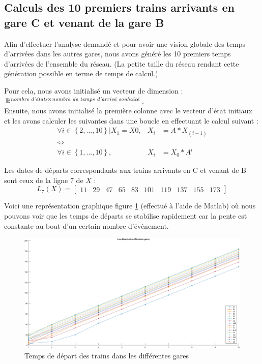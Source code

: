 \subsection{Calculs des 10 premiers trains arrivants en gare C et venant de la gare B}
Afin d'effectuer l'analyse demandé et pour avoir une vision globale des temps d'arrivées dans les autres gares, nous avons généré les 10 premiers temps d'arrivées de l'ensemble du réseau. (La petite taille du réseau rendant cette génération possible en terme de temps de calcul.)

Pour cela, nous avons initialisé un vecteur de dimension : $\mathbb{R}^{ \text{\emph{nombre d'états}} \times \text{\emph{nombre de temps d'arrivé souhaité}}}$.\\
Ensuite, nous avons initialisé la première colonne avec le vecteur d'état initiaux et les avons calculer les suivantes dans une boucle en effectuant le calcul suivant : 
\begin{eqnarray}
\forall i \in \left\lbrace 2, ..., 10\right\rbrace | X_1 = X0 ,&    X_{i}&=A*X_{(i-1)}\\
\Leftrightarrow&&\\
\forall i \in \left\lbrace 1, ..., 10\right\rbrace ,&    X_{i}&=X_0*A^i
\end{eqnarray}

Les dates de départs correspondants aux trains arrivants en C et venant de B sont ceux  de la ligne 7 de $X$ :
\begin{equation}
L_7(X)= \begin{bmatrix} 11&29&47&65&83&101&119&137&155&173 \end{bmatrix}
\end{equation}


Voici une représentation graphique figure \ref{fig:temps_arrivee} (effectué à l'aide de Matlab) où nous pouvons voir que les temps de départs se stabilise rapidement car la pente est constante au bout d'un certain nombre d'événement.
\begin{figure}[!ht]
\centering
\includegraphics[width = .7\textwidth]{./I/images/temps_departs.png}
\caption{\label{fig:temps_arrivee} Temps de départ des trains dans les différentes gares}
\end{figure}


